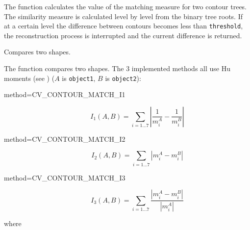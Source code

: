 \begin{description}
\end{description}

The function calculates the value of the matching measure for two contour trees. The similarity measure is calculated level by level from the binary tree roots. If at a certain level the difference between contours becomes less than \texttt{threshold}, the reconstruction process is interrupted and the current difference is returned.

Compares two shapes.


\begin{description}
\end{description}

The function compares two shapes. The 3 implemented methods all use Hu moments (see ) ($A$ is \texttt{object1}, $B$ is \texttt{object2}):

\begin{description}
\item[method=CV\_CONTOUR\_MATCH\_I1]
\[ I_1(A,B) = \sum_{i=1...7} \left| \frac{1}{m^A_i} - \frac{1}{m^B_i} \right| \]

\item[method=CV\_CONTOUR\_MATCH\_I2]
\[ I_2(A,B) = \sum_{i=1...7} \left| m^A_i - m^B_i \right| \]

\item[method=CV\_CONTOUR\_MATCH\_I3]
\[ I_3(A,B) = \sum_{i=1...7} \frac{ \left| m^A_i - m^B_i \right| }{ \left| m^A_i \right| } \]
\end{description}

where

